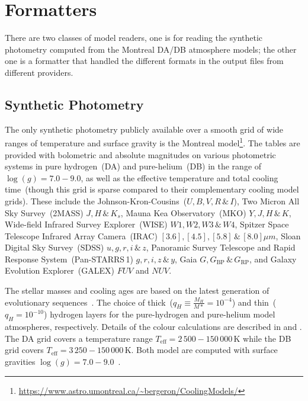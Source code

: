 \documentclass[fleqn,usenatbib]{rasti}
\begin{document}
\section{Formatters}
There are two classes of model readers, one is for reading the synthetic
photometry computed from the Montreal DA/DB atmosphere models; the other one is
a formatter that handled the different formats in the output files from
different providers.

\subsection*{Synthetic Photometry}
The only synthetic photometry publicly available over a smooth grid of wide
ranges of temperature and surface gravity is the Montreal
model\footnote{\url{https://www.astro.umontreal.ca/~bergeron/CoolingModels/}}.
The tables are provided with bolometric and absolute magnitudes on various
photometric systems in pure hydrogen~(DA) and pure-helium~(DB) in the range of
$\log(g)=7.0 - 9.0$, as well as the effective temperature and total cooling
time~(though this grid is sparse compared to their complementary cooling model
grids). These include the Johnson-Kron-Cousins~($U, B, V, R\,\&\,I$),
Two Micron All Sky Survey~(2MASS) $J, H\,\&\,K_{s}$, Mauna Kea Observatory~(MKO)
$Y, J, H\,\&\,K$, Wide-field Infrared Survey Explorer~(WISE) $W1, W2, W3\,\&\,W4$,
Spitzer Space Telescope Infrared Array Camera~(IRAC)
$[3.6], [4.5], [5.8]\,\&\,[8.0] \mu m$, Sloan Digital Sky Survey~(SDSS)
$u, g, r, i\,\&\,z$, Panoramic Survey Telescope and Rapid Response
System~(Pan-STARRS\,1) $g, r, i, z\,\&\,y$,
Gaia $G, G_{\mathrm{BP}}\,\&\,G_{\mathrm{RP}}$, and Galaxy Evolution
Explorer~(GALEX) $FUV$ and $NUV$.

The stellar masses and cooling ages are based on the latest generation of
evolutionary sequences~\citep{2020ApJ...901...93B}. The choice of
thick~($q_H \equiv \frac{M_H}{M*} = 10^{-4}$) and thin~($q_H = 10^{-10}$)
hydrogen layers for the pure-hydrogen and pure-helium model atmospheres,
respectively. Details of the colour calculations are described in
\citet{1995PASP..107.1047B} and \citet{2006AJ....132.1221H}. The DA grid covers
a temperature range $T_{\mathrm{eff}} = 2\,500 - 150\,000$\,K while the DB grid
covers $T_{\mathrm{eff}} = 3\,250 - 150\,000$\,K. Both model are computed with
surface gravities $\log(g) = 7.0 - 9.0$~\citep{2018ApJ...863..184B,
2020ApJ...901...93B, 2011ApJ...730..128T, 2011ApJ...737...28B,
2006ApJ...651L.137K}.
\end{document}
